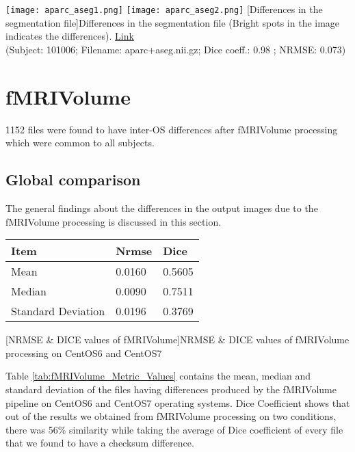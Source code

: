 \begin{center}
\texttt{[image: aparc\_aseg1.png]}%
\texttt{[image: aparc\_aseg2.png]}%
  [Differences in the segmentation file]{Differences in the segmentation file (Bright spots in the image indicates the differences). \href{https://drive.google.com/file/d/1_ZyAtveS1oVle8tAXeKsp1_4KdS2MVoB/view?usp=sharing}{Link}\\(Subject: 101006; Filename: aparc+aseg.nii.gz; Dice coeff.: 0.98 ; NRMSE: 0.073)}
\label{fig:postfreesurfer_aparc_file}
\end{center}

\section{fMRIVolume}\label{sec:fMRI}
1152 files were found to have inter-OS differences after fMRIVolume processing which were common to all subjects.
\subsection{Global comparison}
The general findings about the differences in the output images due to the fMRIVolume processing is discussed in this section.

\begin{center}
\begin{tabular}{|l|l|l|}
\hline
\textbf{Item}      & \textbf{Nrmse}  & \textbf{Dice} \\ \hline
Mean               & 0.0160    & 0.5605   \\ \hline
Median             & 0.0090     & 0.7511   \\ \hline
Standard Deviation & 0.0196     & 0.3769   \\ \hline
\end{tabular}
  [NRMSE \& DICE values of fMRIVolume]{NRMSE \& DICE values of fMRIVolume processing on CentOS6 and CentOS7}
\label{tab:fMRIVolume_Metric_Values}
\end{center}

Table \ref{tab:fMRIVolume_Metric_Values} contains the mean, median and standard deviation of the files having differences produced by the fMRIVolume pipeline on CentOS6 and CentOS7 operating systems. Dice Coefficient shows that out of the results we obtained from fMRIVolume processing on two conditions, there was 56\% similarity while taking the average of Dice coefficient of every file that we found to have a checksum difference.

